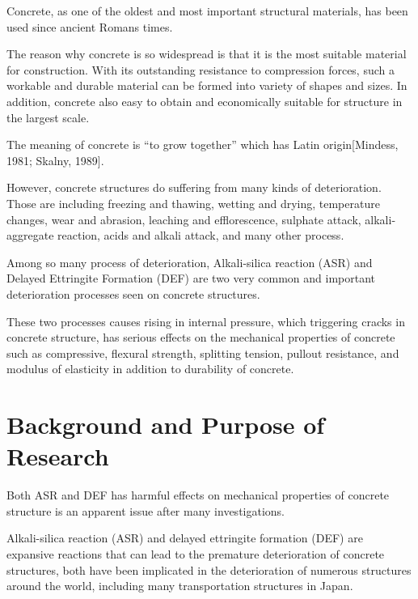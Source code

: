 

Concrete, as one of the oldest and most important structural materials, has been used since ancient Romans times.

The reason why concrete is so widespread is that it is the most suitable material for construction. With its outstanding resistance to compression forces, such a workable and durable material can be formed into variety of shapes and sizes. In addition, concrete also easy to obtain and economically suitable for structure in the largest scale.

The meaning of concrete is “to grow together” which has Latin origin[Mindess, 1981; Skalny, 1989].

However, concrete structures do suffering from many kinds of deterioration. Those are including freezing and thawing, wetting and drying, temperature changes, wear and abrasion, leaching and efflorescence, sulphate attack, alkali-aggregate reaction, acids and alkali attack, and many other process.

Among so many process of deterioration, Alkali-silica reaction (ASR) and Delayed Ettringite Formation (DEF) are two very common and important deterioration processes seen on concrete structures.

These two processes causes rising in internal pressure, which triggering cracks in concrete structure, has serious effects on the mechanical properties of concrete such as compressive, flexural strength, splitting tension, pullout resistance, and modulus of elasticity in addition to durability of concrete.

\section{Background and Purpose of Research}

Both ASR and DEF has harmful effects on mechanical properties of concrete structure is an apparent issue after many investigations.

Alkali-silica reaction (ASR) and delayed ettringite formation (DEF) are expansive reactions that can lead to the premature deterioration of concrete structures, both have been implicated in the deterioration of numerous structures around the world, including many transportation structures in Japan.

